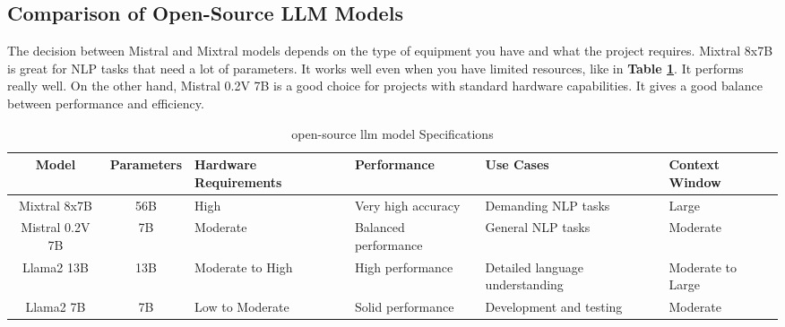 \subsection{Comparison of Open-Source LLM Models}
The decision between Mistral and Mixtral models depends on the type of equipment you have and what the project requires. Mixtral 8x7B is great for NLP tasks that need a lot of parameters. It works well even when you have limited resources, like in \textbf{Table \ref{tab:model_specs}}. It performs really well. On the other hand, Mistral 0.2V 7B is a good choice for projects with standard hardware capabilities. It gives a good balance between performance and efficiency.
\begin{table}[H]
\begin{center}
\caption{open-source llm model Specifications}
\label{tab:model_specs}
\begin{tabular}{|c|c|p{2cm}|p{2cm}|p{2cm}|p{2cm}|}
\hline
\rowcolor[gray]{0.8} 
\textbf{Model} & \textbf{Parameters} & \textbf{Hardware Requirements} & \textbf{Performance} & \textbf{Use Cases} & \textbf{Context Window} \\ \hline
Mixtral 8x7B & 56B & High & Very high accuracy & Demanding NLP tasks & Large \\ \hline
Mistral 0.2V 7B & 7B & Moderate & Balanced performance & General NLP tasks & Moderate \\ \hline
Llama2 13B & 13B & Moderate to High & High performance & Detailed language understanding & Moderate to Large \\ \hline
Llama2 7B & 7B & Low to Moderate & Solid performance & Development and testing & Moderate \\ \hline
\end{tabular}
\end{center}
\end{table}
